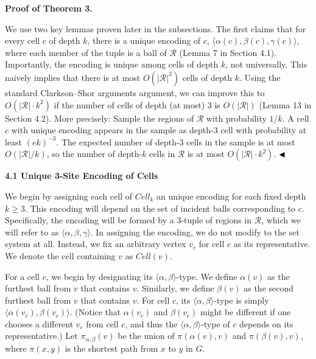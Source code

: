 \par\medskip\noindent\textbf{Proof of Theorem 3.}\par
We use two key lemmas proven later in the subsections. The first claims that for every cell $c$ of depth $k$, there is a unique encoding of $c$, $\langle\alpha(c),\beta(c),\gamma(c)\rangle$, where each member of the tuple is a ball of $\mathcal{R}$ (Lemma 7 in Section 4.1). Importantly, the encoding is unique among cells of depth $k$, not universally. This naively implies that there is at most $O(|\mathcal{R}|^{3})$ cells of depth $k$. Using the standard Clarkson–Shor arguments argument, we can improve this to $O(|\mathcal{R}|\cdot k^{2})$ if the number of cells of depth (at most) $3$ is $O(|\mathcal{R}|)$ (Lemma 13 in Section 4.2). More precisely: Sample the regions of $\mathcal{R}$ with probability $1/k$. A cell $c$ with unique encoding appears in the sample as depth-3 cell with probability at least $(ek)^{-3}$. The expected number of depth-3 cells in the sample is at most $O(|\mathcal{R}|/k)$, so the number of depth-$k$ cells in $\mathcal{R}$ is at most $O(|\mathcal{R}|\cdot k^{2})$. $\hfill\blacktriangleleft$
\par
\par
\par\medskip\noindent\textbf{4.1 Unique 3-Site Encoding of Cells}\par
We begin by assigning each cell of $\mathit{Cell}_{k}$ an unique encoding for each fixed depth $k\geq 3$. This encoding will depend on the set of incident balls corresponding to $c$. Specifically, the encoding will be formed by a 3-tuple of regions in $\mathcal{R}$, which we will refer to as $\langle\alpha,\beta,\gamma\rangle$. In assigning the encoding, we do not modify to the set system at all. Instead, we fix an arbitrary vertex $v_{c}$ for cell $c$ as its representative. We denote the cell containing $v$ as $\mathit{Cell}(v)$.
\par
\par
For a cell $c$, we begin by designating its $\langle\alpha,\beta\rangle$-type. We define $\alpha(v)$ as the furthest ball from $v$ that contains $v$. Similarly, we define $\beta(v)$ as the second furthest ball from $v$ that contains $v$. For cell $c$, its $\langle\alpha,\beta\rangle$-type is simply $\langle\alpha(v_{c}),\beta(v_{c})\rangle$. (Notice that $\alpha(v_{c})$ and $\beta(v_{c})$ might be different if one chooses a different $v_{c}$ from cell $c$, and thus the $\langle\alpha,\beta\rangle$-type of $c$ depends on its representative.) Let $\pi_{\alpha,\beta}(v)$ be the union of $\pi(\alpha(v),v)$ and $\pi(\beta(v),v)$, where $\pi(x,y)$ is the shortest path from $x$ to $y$ in $G$.
